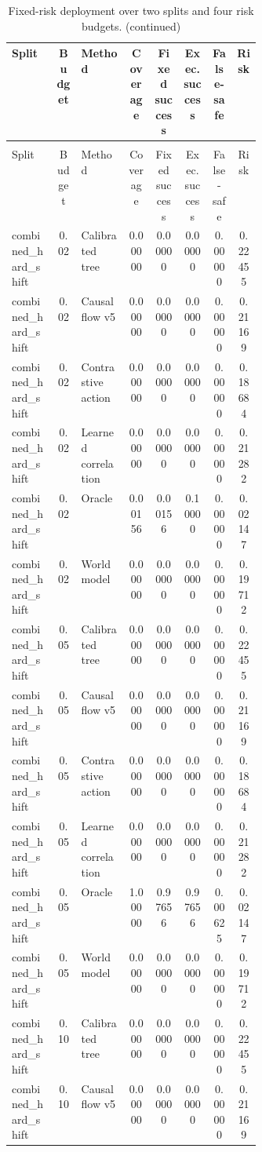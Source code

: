 \documentclass{article}
\begin{document}
\begin{center}
\scriptsize
\begin{longtable}{p{0.18\linewidth}cp{0.19\linewidth}ccccc}
\caption{Fixed-risk deployment over two splits and four risk budgets.}\label{tab:fixed-risk}\\
\toprule
Split & Budget & Method & Coverage & Fixed success & Exec. success & False-safe & Risk\\
\midrule
\endfirsthead
\caption[]{Fixed-risk deployment over two splits and four risk budgets. (continued)}\\
\toprule
Split & Budget & Method & Coverage & Fixed success & Exec. success & False-safe & Risk\\
\midrule
\endhead
combined\_hard\_shift & 0.02 & Calibrated tree & 0.00000 & 0.00000 & 0.00000 & 0.00000 & 0.22455\\
combined\_hard\_shift & 0.02 & Causal flow v5 & 0.00000 & 0.00000 & 0.00000 & 0.00000 & 0.21169\\
combined\_hard\_shift & 0.02 & Contrastive action & 0.00000 & 0.00000 & 0.00000 & 0.00000 & 0.18684\\
combined\_hard\_shift & 0.02 & Learned correlation & 0.00000 & 0.00000 & 0.00000 & 0.00000 & 0.21282\\
combined\_hard\_shift & 0.02 & Oracle & 0.00156 & 0.00156 & 0.10000 & 0.00000 & 0.02147\\
combined\_hard\_shift & 0.02 & World model & 0.00000 & 0.00000 & 0.00000 & 0.00000 & 0.19712\\
combined\_hard\_shift & 0.05 & Calibrated tree & 0.00000 & 0.00000 & 0.00000 & 0.00000 & 0.22455\\
combined\_hard\_shift & 0.05 & Causal flow v5 & 0.00000 & 0.00000 & 0.00000 & 0.00000 & 0.21169\\
combined\_hard\_shift & 0.05 & Contrastive action & 0.00000 & 0.00000 & 0.00000 & 0.00000 & 0.18684\\
combined\_hard\_shift & 0.05 & Learned correlation & 0.00000 & 0.00000 & 0.00000 & 0.00000 & 0.21282\\
combined\_hard\_shift & 0.05 & Oracle & 1.00000 & 0.97656 & 0.97656 & 0.00625 & 0.02147\\
combined\_hard\_shift & 0.05 & World model & 0.00000 & 0.00000 & 0.00000 & 0.00000 & 0.19712\\
combined\_hard\_shift & 0.10 & Calibrated tree & 0.00000 & 0.00000 & 0.00000 & 0.00000 & 0.22455\\
combined\_hard\_shift & 0.10 & Causal flow v5 & 0.00000 & 0.00000 & 0.00000 & 0.00000 & 0.21169\\

\end{longtable}
\end{center}
\end{document}
